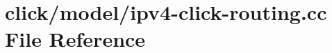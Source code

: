 \hypertarget{ipv4-click-routing_8cc}{}\section{click/model/ipv4-\/click-\/routing.cc File Reference}
\label{ipv4-click-routing_8cc}

